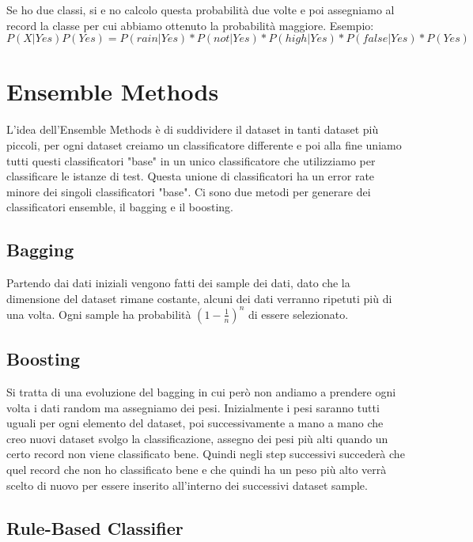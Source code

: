 \documentclass[14pt]{extreport}
\begin{document}
Se ho due classi, si e no calcolo questa probabilità due volte e poi assegniamo al record la classe per cui abbiamo ottenuto la probabilità maggiore.
Esempio:
\begin{equation}
    P(X|Yes)P(Yes) = P(rain|Yes)*P(not|Yes)*P(high|Yes)*P(false|Yes)*P(Yes)
\end{equation}

\section{Ensemble Methods}

L'idea dell'Ensemble Methods è di suddividere il dataset in tanti dataset più piccoli, per ogni dataset creiamo un classificatore differente e poi alla fine uniamo tutti questi classificatori "base" in un unico classificatore che utilizziamo per classificare le istanze di test. 
Questa unione di classificatori ha un error rate minore dei singoli classificatori "base".
Ci sono due metodi per generare dei classificatori ensemble, il bagging e il boosting.

\subsection{Bagging}

Partendo dai dati iniziali vengono fatti dei sample dei dati, dato che la dimensione del dataset rimane costante, alcuni dei dati verranno ripetuti più di una volta.
Ogni sample ha probabilità $(1-\frac{1}{n})^n$ di essere selezionato.

\subsection{Boosting}

Si tratta di una evoluzione del bagging in cui però non andiamo a prendere ogni volta i dati random ma assegniamo dei pesi. 
Inizialmente i pesi saranno tutti uguali per ogni elemento del dataset, poi successivamente a mano a mano che creo nuovi dataset svolgo la classificazione, assegno dei pesi più alti quando un certo record non viene classificato bene.
Quindi negli step successivi succederà che quel record che non ho classificato bene e che quindi ha un peso più alto verrà scelto di nuovo per essere inserito all'interno dei successivi dataset sample.

\subsection{Rule-Based Classifier}
\end{document}
